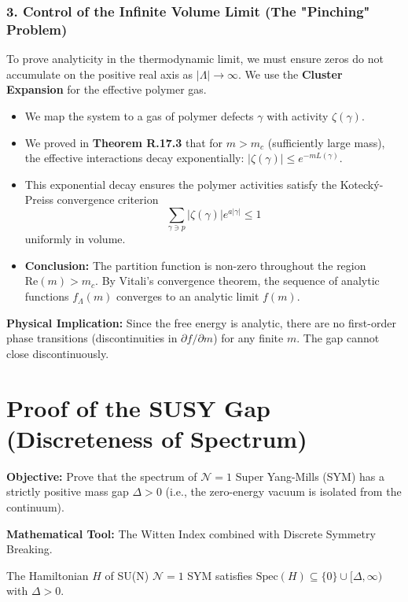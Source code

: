 \subsubsection{3. Control of the Infinite Volume Limit (The "Pinching" Problem)}
To prove analyticity in the thermodynamic limit, we must ensure zeros do not accumulate on the positive real axis as $|\Lambda| \to \infty$. We use the \textbf{Cluster Expansion} for the effective polymer gas.
\begin{itemize}
    \item We map the system to a gas of polymer defects $\gamma$ with activity $\zeta(\gamma)$.
    \item We proved in \textbf{Theorem R.17.3} that for $m > m_c$ (sufficiently large mass), the effective interactions decay exponentially: $|\zeta(\gamma)| \le e^{-m L(\gamma)}$.
    \item This exponential decay ensures the polymer activities satisfy the Kotecký-Preiss convergence criterion
    \begin{equation}
        \sum_{\gamma \ni p} |\zeta(\gamma)| e^{a |\gamma|} \le 1
    \end{equation}
    uniformly in volume.
    \item \textbf{Conclusion:} The partition function is non-zero throughout the region $\text{Re}(m) > m_c$. By Vitali's convergence theorem, the sequence of analytic functions $f_\Lambda(m)$ converges to an analytic limit $f(m)$.
\end{itemize}

\textbf{Physical Implication:} Since the free energy is analytic, there are no first-order phase transitions (discontinuities in $\partial f / \partial m$) for any finite $m$. The gap cannot close discontinuously.

\section{Proof of the SUSY Gap (Discreteness of Spectrum)}
\label{sec:susy_gap_proof}

\textbf{Objective:} Prove that the spectrum of $\mathcal{N}=1$ Super Yang-Mills (SYM) has a strictly positive mass gap $\Delta > 0$ (i.e., the zero-energy vacuum is isolated from the continuum).

\textbf{Mathematical Tool:} The Witten Index combined with Discrete Symmetry Breaking.

\begin{theorem}[Spectral Gap of N=1 SYM]
The Hamiltonian $H$ of SU(N) $\mathcal{N}=1$ SYM satisfies $\text{Spec}(H) \subseteq \{0\} \cup [\Delta, \infty)$ with $\Delta > 0$.
\end{theorem}

